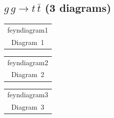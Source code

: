\documentclass[a4paper,11pt]{article}
\makeatletter
\newcommand{\FeynDiagram}[1]{\csname feyndiagram#1\endcsname}
\newcommand{\FeynCell}[1]{\begin{tabular}[t]{@{}c@{}}\FeynDiagram{#1}\\[1ex]\small Diagram~#1\end{tabular}}
\makeatother
\begin{document}
\setlength{\parindent}{0pt}
\subsection*{$g\,g \to t\,\bar{t}$ \normalfont(3 diagrams)}
\noindent \FeynCell{1}\hfill \FeynCell{2}\hfill \FeynCell{3}\par\bigskip
\end{document}
